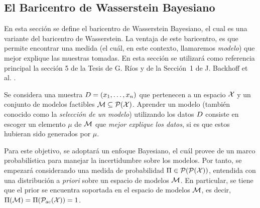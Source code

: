 \subsection{El Baricentro de Wasserstein Bayesiano}\label{ssec:baricentro-Wasserstein-Bayesiano}  %

En esta sección se define el baricentro de Wasserstein Bayesiano, el cual es una variante del baricentro de Wasserstein. La ventaja de este baricentro, es que permite encontrar una medida (el cuál, en este contexto, llamaremos \emph{modelo}) que mejor explique las muestras tomadas.
En esta sección se utilizará como referencia principal la sección 5 de la Tesis de G. Ríos \cite{rios2020contributions} y de la Sección~1 de J. Backhoff et al. \cite{backhoff2022bayesian}.

Se considera una muestra $\Data = \left(x_1,\ldots, x_n \right)$ que pertenecen a un espacio $\cX$ y un conjunto de modelos factibles
$\Models \subseteq \ProbSpace[\cX]$. Aprender un modelo (también conocido como la \emph{selección de un modelo}) utilizando los datos $\Data$  consiste en escoger un elemento $\mu$ de $\Models$ que \emph{mejor explique los datos}, si es que estos hubieran sido generados por $\mu$.

Para este objetivo, se adoptará un enfoque Bayesiano, el cuál provee de un marco probabilística para manejar la incertidumbre sobre los modelos. Por tanto, se empezará considerando una medida de probabilidad $\Pi \in \ProbSpace[\ProbSpace[\cX] ] $, entendida con una distribución a \textit{priori} sobre un espacio de modelos $\Models$. En particular, se tiene que el prior se encuentra soportada en el espacio de modelos $\Models$, es decir, $\Pi(\Models) = \Pi(\ProbSpaceAC[\cX] ) = 1$.

